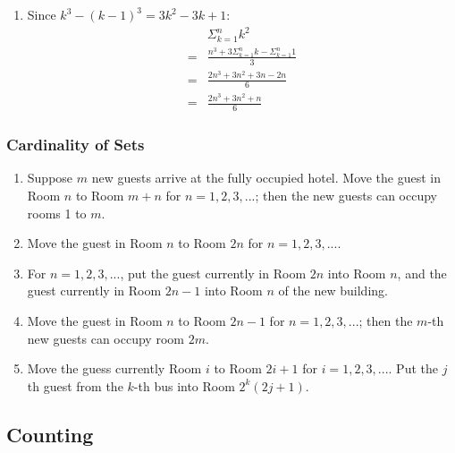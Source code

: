 \documentclass{sig-alternate-05-2015}
\begin{document}
\begin{enumerate}
\item Since $k^3 - (k - 1)^3 = 3k^2 - 3k + 1$:
\begin{align}
	& \Sigma_{k = 1}^n k^2\\
	= & \frac{n^3 + 3\Sigma_{k = 1}^n k - \Sigma_{k = 1}^n 1}{3}\\
	= & \frac{2n^3 + 3n^2 + 3n - 2n}{6}\\
	= & \frac{2n^3 + 3n^2 + n}{6}
\end{align}
\end{enumerate}
\subsubsection{Cardinality of Sets}
\begin{enumerate}
\item Suppose $m$
new guests arrive at the fully occupied hotel. Move the guest
in Room $n$ to Room $m + n$ for $n = 1, 2, 3, ...$; then the new
guests can occupy rooms 1 to $m$.
\item Move the guest
in Room $n$ to Room $2n$ for $n = 1, 2, 3, ...$.
\item For $n = 1, 2, 3, ...$, put the guest currently in Room $2n$ into Room $n$, and the guest
currently in Room $2n - 1$ into Room $n$ of the new building.
\item Move the guest
in Room $n$ to Room $2n - 1$ for $n = 1, 2, 3, ...$; then the $m$-th new guests can occupy room $2m$.
\item Move the guess currently Room $i$ to Room $2i + 1$ for $i = 1, 2, 3, ...$. Put the $j$ th guest from the $k$-th bus into
Room $2^k(2j + 1)$.
\end{enumerate}

\subsection{Counting}
\end{document}

